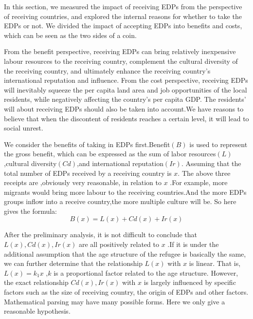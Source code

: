 \documentclass{mcmthesis}
\begin{document}
In this section, we measured the impact of receiving EDPs from the perspective of receiving countries, and explored the internal reasons for whether to take the EDPs or not. We divided the impact of accepting EDPs into benefits and costs, which can be seen as the two sides of a coin. 

From the benefit perspective, receiving EDPs can bring relatively inexpensive labour resources to the receiving country, complement the cultural diversity of the receiving country, and ultimately enhance the receiving country's international reputation and influence. From the cost perspective, receiving EDPs will inevitably squeeze the per capita land area and job opportunities of the local residents, while negatively affecting the country's per capita GDP. The residents' will about receiving EDPs should also be taken into account.We have reasons to believe that when the discontent of residents reaches a certain level, it will lead to social unrest. 

We consider the benefits of taking in EDPs first.Benefit$ (B) $ is used to represent the gross benefit, which can be expressed as the sum of labor resources$ (L) $,cultural diversity$ (Cd) $,and international reputation$ (Ir) $. Assuming that the total number of EDPs received by a receiving country is $ x $. The above three receipts are ,obviously very reasonable, in relation to $ x $ .For example, more migrants would bring more labour to the receiving countries.And the more EDPs groups inflow into a receive country,the more multiple culture will be. So here gives the formula:
\begin{equation}
B(x)=L(x)+Cd(x)+Ir(x)
\end{equation}

After the preliminary analysis, it is not difficult to conclude that $ L(x),Cd(x),Ir(x) $ are all positively related to $ x $ .If it is under the additional assumption that the age structure of the refugee is  basically the same, we can further determine that the relationship $ L(x) $ with $ x $ is linear. That is, $  L(x)=k_{1}x $ ,$ k $ is a proportional factor related to the age structure.  However, the exact relationship $ Cd(x),Ir(x) $ with $ x $ is largely influenced by specific factors such as the size of  receiving country, the origin of EDPs and other factors. Mathematical parsing may have many possible forms. Here we only give a reasonable hypothesis. 
\end{document}
